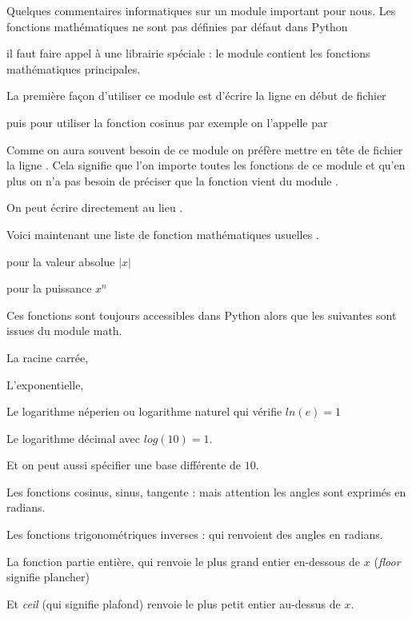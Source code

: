 \diapo

Quelques commentaires informatiques sur un module important pour nous.
Les fonctions mathématiques ne sont pas définies par défaut dans Python

il faut faire appel à une librairie spéciale : le module  
contient les fonctions mathématiques principales.

La première façon d'utiliser ce module est d'écrire la ligne   en début de fichier

puis pour utiliser la fonction cosinus par exemple on l'appelle par 


\change

Comme on aura souvent besoin de ce module on préfère mettre en tête de fichier la ligne 
.
  Cela signifie que l'on importe toutes les fonctions de ce module 
  et qu'en plus on n'a pas besoin de préciser que la fonction
  vient du module . 
  
  On peut écrire directement  au lieu .
  
\change


Voici maintenant une liste de fonction mathématiques usuelles .

        pour la valeur absolue   $|x|$  
   
        pour la puissance   $x^n$  
   
Ces fonctions sont toujours accessibles dans Python alors que les suivantes sont issues du module math.

La racine carrée,

L'exponentielle,

Le logarithme néperien ou logarithme naturel qui vérifie $ln(e)=1$

Le logarithme décimal avec $log(10)=1$.

Et on peut aussi spécifier une base différente de $10$.

Les fonctions cosinus, sinus, tangente : mais attention les angles sont exprimés en radians.
   
Les fonctions trigonométriques inverses : qui renvoient des angles en radians. 
   
La fonction partie entière, qui renvoie le plus grand entier en-dessous de $x$ (\emph{floor} signifie plancher)

Et \emph{ceil} (qui signifie plafond) renvoie le plus petit entier au-dessus de $x$.



